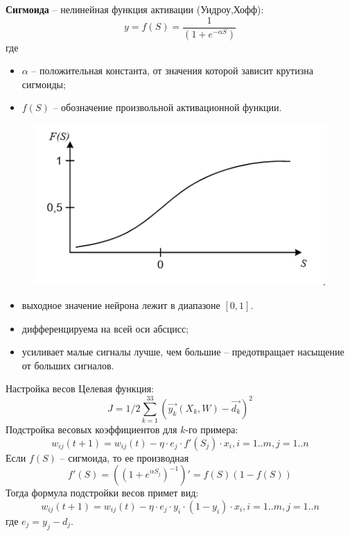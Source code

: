 \documentclass{beamer}
\begin{document}
\begin{frame}[t]
	\textbf{Сигмоида} -- нелинейная функция активации (Уидроу,Хофф): 
	\[ y = f(S) = \frac{1}{(1+e^{-\alpha S})} \]
	где
	\begin{itemize}
		\item $\alpha$ -- положительная константа, от значения которой зависит крутизна сигмоиды;		
		\item $f(S)$ -- обозначение произвольной активационной функции.		
	\end{itemize}
	\begin{figure}[h]
		\centering
		\includegraphics[scale=0.5]{images/lec03-sigmoid.png}
	\end{figure}
	\begin{itemize}
		\item выходное значение нейрона лежит в диапазоне $[0,1]$. 
		\item дифференцируема на всей оси абсцисс; 
		\item усиливает малые сигналы лучше, чем большие -- предотвращает насыщение от больших сигналов.
	\end{itemize}	
\end{frame}

\begin{frame}[t]{Настройка весов}
	Целевая функция:
	\[J=1/2 \sum_{k=1}^{33} (\overrightarrow{y_k}(X_k, W)-\overrightarrow{d_k})^2\]
	Подстройка весовых коэффициентов для $k$-го примера:
	\[w_{ij}(t+1)=w_{ij}(t)-\eta\cdot e_j\cdot f'(S_j)\cdot x_i, i=1..m, j=1..n\]	
	Если $f(S)$ -- сигмоида, то ее производная
	\[f'(S)=((1+e^{\alpha S_j})^{-1})'=f(S)(1-f(S))\]
	Тогда формула подстройки весов примет вид:
	\[w_{ij}(t+1)=w_{ij}(t)-\eta\cdot e_j\cdot y_i\cdot (1-y_i)\cdot x_i, i=1..m, j=1..n\]		
	где $e_j=y_j-d_j$.
\end{frame}
\end{document}
